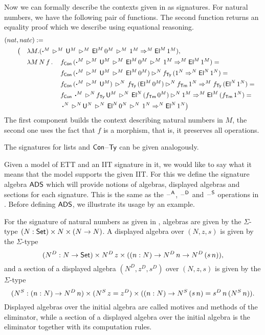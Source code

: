 \documentclass[a4paper,UKenglish,cleveref, autoref]{lipics-v2019}
\begin{document}
\begin{example}\label{ex:signatures}
  Now we can formally describe the contexts given in
   as signatures. For natural numbers, we have the
  following pair of functions. The second function returns an equality
  proof which we describe using equational reasoning.
  \begin{alignat*}{5}
    & \rlap{$(nat,natc) := $} \\
    & \hspace{1em} && \big( && \rlap{$\lambda M.(\boldsymbol{\cdot}^M\,\ext^M\,\U^M\,\ext^M\,\El^M\,0^M\,\ext^M\,1^M \Ra^M \El^M\,1^M),$} \\
    & && && \lambda M\,N\,f\,.\, && f_\Con\,(\boldsymbol{\cdot}^M\,\ext^M\,\U^M\,\ext^M\,\El^M\,0^M\,\ext^M\,1^M \Ra^M \El^M\,1^M) = \\
    & && && && f_\Con\,(\boldsymbol{\cdot}^M\,\ext^M\,\U^M\,\ext^M\,\El^M\,0^M)\ext^N f_\Ty\,(1^N\Ra^N \El^N\,1^N) = \\
    & && && && f_\Con\,(\boldsymbol{\cdot}^M\,\ext^M\,\U^M)\,\ext^N\,f_\Ty\,(\El^M\,0^M)\ext^N f_\Tm\,1^N\Ra^M f_\Ty\,(\El^N\,1^N) = \\
    & && && && f_\Con\,\boldsymbol{\cdot}^M\,\ext^N\,f_\Ty\,\U^M\,\ext^N\,\El^N\,(f_\Tm\,0^M)\ext^N 1^M\Ra^M \El^M\,(f_\Tm\,1^N) = \\
    & && && && \boldsymbol{\cdot}^N\,\ext^N\,\U^N\,\ext^N\,\El^N\,0^N\,\ext^N\,1^N \Ra^N \El^N\,1^N \big)
  \end{alignat*}
  The first component builds the context describing natural numbers in
  $M$, the second one uses the fact that $f$ is a morphism, that is,
  it preserves all operations.

  The signatures for lists and $\mathsf{Con}$--$\mathsf{Ty}$ can be given analogously.
\end{example}

Given a model of ETT and an IIT signature in it, we would like to say
what it means that the model supports the given IIT. For this we
define the signature algebra $\mathsf{ADS}$ which will provide notions of
algebras, displayed algebras and sections for each signature. This is
the same as the $\mathord{\hspace{1pt}\text{--}\hspace{1pt}}^{\mathsf{A}}$, $\mathord{\hspace{1pt}\text{--}\hspace{1pt}}^{\mathsf{D}}$ and $\mathord{\hspace{1pt}\text{--}\hspace{1pt}}^{\mathsf{S}}$ operations in
\cite{Kaposi:2019:CQI:3302515.3290315}. Before defining $\mathsf{ADS}$, we
illustrate its usage by an example.

\begin{example}\label{ex:adsnat}
  For the signature of natural numbers as given in
  , algebras are given by the $\Sigma$-type
  $(N:\mathsf{Set})\times N\times(N\rightarrow N)$. A displayed algebra over $(N,z,s)$
  is given by the $\Sigma$-type
  \[
    (N^D:N\rightarrow\mathsf{Set})\times N^D\,z \times((n:N)\rightarrow N^D\,n\rightarrow N^D\,(s\,n)),
  \]
  and a section of a displayed algebra $(N^D,z^D,s^D)$ over $(N,z,s)$
  is given by the $\Sigma$-type
  \[
    (N^S:(n:N)\rightarrow N^D\,n)\times (N^S\,z = z^D) \times((n:N)\rightarrow N^S\,(s\,n) = s^D\,n\,(N^S\,n)).
  \]
  Displayed algebras over the initial algebra are called motives and
  methods of the eliminator, while a section of a displayed algebra
  over the initial algebra is the eliminator together with its
  computation rules.
\end{example}
\end{document}
